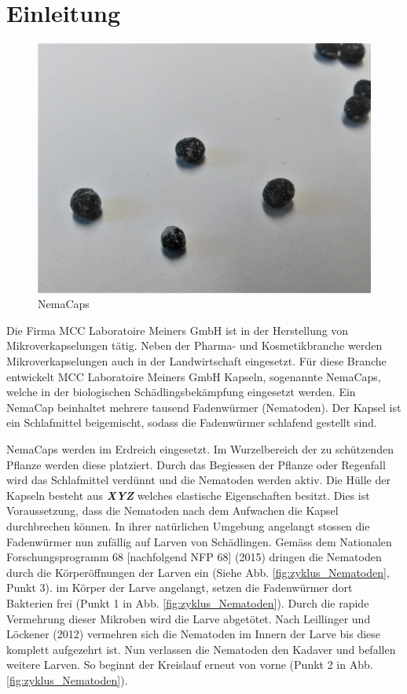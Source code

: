 \newpage
\section{Einleitung}
\begin{figure}
	\includegraphics[scale=0.11]{Illustrationen/3-Einleitung/nemacaps.jpg}
	\caption{NemaCaps}
	\label{fig:nemacaps}
\end{figure}
Die Firma MCC Laboratoire Meiners GmbH ist in der Herstellung von Mikroverkapselungen tätig. Neben der Pharma- und Kosmetikbranche werden Mikroverkapselungen auch in der Landwirtschaft eingesetzt. Für diese Branche entwickelt MCC Laboratoire Meiners GmbH Kapseln, sogenannte NemaCaps, welche in der biologischen Schädlingsbekämpfung eingesetzt werden. Ein NemaCap beinhaltet mehrere tausend Fadenwürmer (Nematoden). Der Kapsel ist ein Schlafmittel beigemischt, sodass die Fadenwürmer schlafend gestellt sind. 

NemaCaps werden im Erdreich eingesetzt. Im Wurzelbereich der zu schützenden Pflanze werden diese platziert. Durch das Begiessen der Pflanze oder Regenfall wird das Schlafmittel verdünnt und die Nematoden werden aktiv. Die Hülle der Kapseln besteht aus \textbf{\textit{XYZ}} welches elastische Eigenschaften besitzt. Dies ist Voraussetzung, dass die Nematoden nach dem Aufwachen die Kapsel durchbrechen können.\newline
In ihrer natürlichen Umgebung angelangt stossen die Fadenwürmer nun zufällig auf Larven von Schädlingen. Gemäss dem Nationalen Forschungsprogramm 68 [nachfolgend NFP 68] (2015) dringen die Nematoden durch die Körperöffnungen der Larven ein (Siehe Abb.  \ref{fig:zyklus_Nematoden}, Punkt 3). im Körper der Larve angelangt, setzen die Fadenwürmer dort Bakterien frei (Punkt 1 in Abb.  \ref{fig:zyklus_Nematoden}). Durch die rapide Vermehrung dieser Mikroben wird die Larve abgetötet. Nach Leillinger und Löckener (2012) vermehren sich die Nematoden im Innern der Larve bis diese komplett aufgezehrt ist. Nun verlassen die Nematoden den Kadaver und befallen weitere Larven. So beginnt der Kreislauf erneut von vorne (Punkt 2 in Abb.  \ref{fig:zyklus_Nematoden}).
\newline

